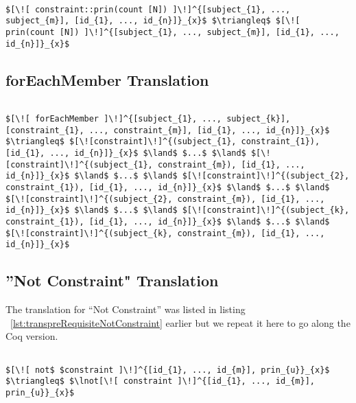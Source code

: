 \lstset{mathescape, language=AST}  
\begin{lstlisting}[frame=single, caption={Constraint Translation {$\colon$} Count by Principal},label={lst:transconstraintCountbyPrin}]

$[\![ constraint::prin(count [N]) ]\!]^{[subject_{1}, ..., subject_{m}], [id_{1}, ..., id_{n}]}_{x}$ $\triangleq$ $[\![ prin(count [N]) ]\!]^{[subject_{1}, ..., subject_{m}], [id_{1}, ..., id_{n}]}_{x}$ 
\end{lstlisting}


\subsection{forEachMember Translation}

\lstset{mathescape, language=AST}  
\begin{lstlisting}[frame=single, caption={ForEachMember Translation {$\colon$} Count by Principal},label={lst:transforEachMember}]

$[\![ forEachMember ]\!]^{[subject_{1}, ..., subject_{k}], [constraint_{1}, ..., constraint_{m}], [id_{1}, ..., id_{n}]}_{x}$ $\triangleq$ $[\![constraint]\!]^{(subject_{1}, constraint_{1}), [id_{1}, ..., id_{n}]}_{x}$ $\land$ $...$ $\land$ $[\![constraint]\!]^{(subject_{1}, constraint_{m}), [id_{1}, ..., id_{n}]}_{x}$ $\land$ $...$ $\land$ $[\![constraint]\!]^{(subject_{2}, constraint_{1}), [id_{1}, ..., id_{n}]}_{x}$ $\land$ $...$ $\land$ $[\![constraint]\!]^{(subject_{2}, constraint_{m}), [id_{1}, ..., id_{n}]}_{x}$ $\land$ $...$ $\land$ $[\![constraint]\!]^{(subject_{k}, constraint_{1}), [id_{1}, ..., id_{n}]}_{x}$ $\land$ $...$ $\land$ $[\![constraint]\!]^{(subject_{k}, constraint_{m}), [id_{1}, ..., id_{n}]}_{x}$ 

\end{lstlisting}

\subsection{''Not Constraint" Translation}

The translation for ``Not Constraint'' was listed in listing ~\ref{lst:transpreRequisiteNotConstraint} earlier but we repeat it here to go along the Coq version. 

\lstset{mathescape, language=AST}  
\begin{lstlisting}[frame=single, caption={Not Constraint Translation},label={lst:transnotCons}]

$[\![ not$ $constraint ]\!]^{[id_{1}, ..., id_{m}], prin_{u}}_{x}$ $\triangleq$ $\lnot[\![ constraint ]\!]^{[id_{1}, ..., id_{m}], prin_{u}}_{x}$ 

\end{lstlisting}

